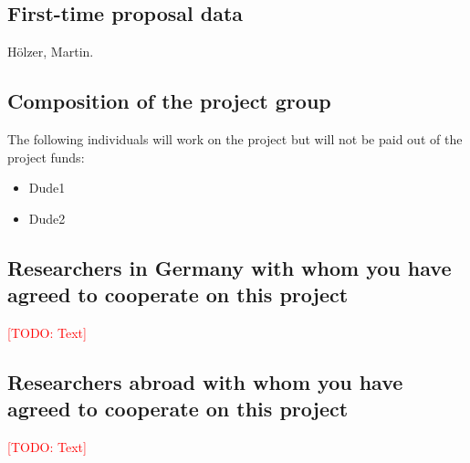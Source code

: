 \documentclass[american,firsttime]{dfgproposal}
\newcommand{\todo}[1]{\xspace{\textcolor{red}{[TODO: #1]}}\xspace}
\begin{document}
	\subsection{First-time proposal data}
	H\"olzer, Martin.
	
	\subsection{Composition of the project group}
	The following individuals will work on the project but will not be paid out of
	the project funds:
	
	\begin{itemize}
		\item Dude1
		\item Dude2
	\end{itemize}
	
	\subsection{Researchers in Germany with whom you have agreed to cooperate on this project}
	\todo{Text}
	
	\subsection{Researchers abroad with whom you have agreed to cooperate on this project}
	\todo{Text}
	
\end{document}
